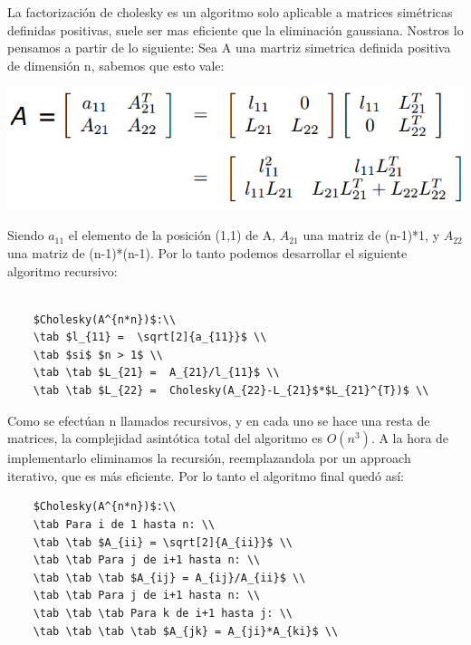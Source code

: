 La factorización de cholesky es un algoritmo solo aplicable a matrices simétricas definidas positivas, suele ser mas eficiente que la eliminación gaussiana. Nostros lo pensamos a partir de lo siguiente: Sea A una martriz simetrica definida positiva de dimensión n, sabemos que esto vale:

\includegraphics{img/chol.png}

Siendo $a_{11}$ el elemento de la posición (1,1) de A, $A_{21}$ una matriz de (n-1)*1, y $A_{22}$ una matriz de (n-1)*(n-1). Por lo tanto podemos desarrollar el siguiente algoritmo recursivo:

\begin{verbatim}

    $Cholesky(A^{n*n})$:\\
    \tab $l_{11} =  \sqrt[2]{a_{11}}$ \\
    \tab $si$ $n > 1$ \\
    \tab \tab $L_{21} =  A_{21}/l_{11}$ \\
    \tab \tab $L_{22} =  Cholesky(A_{22}-L_{21}$*$L_{21}^{T})$ \\
\end{verbatim}

Como se efectúan n llamados recursivos, y en cada uno se hace una resta de matrices, la complejidad asintótica total del algoritmo es $O(n^3)$. A la hora de implementarlo eliminamos la recursión, reemplazandola por un approach iterativo, que es más eficiente. Por lo tanto el algoritmo final quedó así:

\begin{verbatim}
    $Cholesky(A^{n*n})$:\\
    \tab Para i de 1 hasta n: \\
    \tab \tab $A_{ii} = \sqrt[2]{A_{ii}}$ \\
    \tab \tab Para j de i+1 hasta n: \\
    \tab \tab \tab $A_{ij} = A_{ij}/A_{ii}$ \\
    \tab \tab Para j de i+1 hasta n: \\
    \tab \tab \tab Para k de i+1 hasta j: \\
    \tab \tab \tab \tab $A_{jk} = A_{ji}*A_{ki}$ \\
\end{verbatim}

